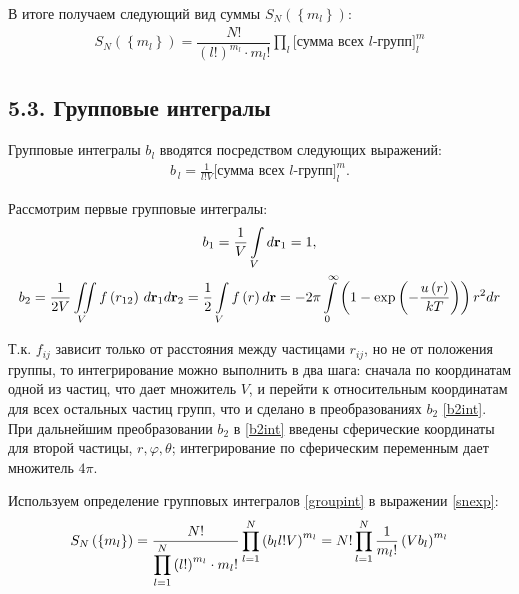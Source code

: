 В итоге получаем следующий вид суммы $S_N \left( \left\{ m_l \right\} \right)$:
\vverh
\begin{gather}
	S_N \left( \left\{ m_l \right\} \right) = \dfrac{N!}{\displaystyle \left( l! \right)^{m_l} \cdot m_l!} \prod_{l} \bigg[ \text{сумма всех $l$-групп} \bigg]^m_l \label{snexp}
\end{gather}

\subsection*{\textbf{5.3.} Групповые интегралы \cite{mayer}}

Групповые интегралы $b_l$ вводятся посредством следующих выражений:
\vverh
\begin{gather}
	b_{\, l} = \frac{1}{l! V} \bigg[ \text{сумма всех $l$-групп} \bigg]^m_l . \label{groupint}
\end{gather}

Рассмотрим первые групповые интегралы:
\vverh
\begin{gather}
	b_1 = \frac{1}{V} \int\limits_V d \mathbf{r}_1 = 1, \notag \\
	b_2 = \frac{1}{2 V} \iint\limits_V f \left( r_{12} \right) \, d \mathbf{r}_1 d \mathbf{r}_2 = \frac{1}{2} \int\limits_V f \left( r \right) d \mathbf{r} = - 2 \pi \int\limits_{0}^{\infty} \left( 1 - \exp \left( - \frac{u \left( r \right)}{kT} \right) \right) r^2 d r \label{b2int}  
\end{gather}

Т.к. $f_{ij}$ зависит только от расстояния между частицами $r_{ij}$, но не от положения группы, то интегрирование можно выполнить в два шага: сначала по координатам одной из частиц, что дает множитель $V$, и перейти к относительным координатам для всех остальных частиц групп, что и сделано в преобразованиях $b_2$ \eqref{b2int}. При дальнейшим преобразовании $b_2$ в \eqref{b2int} введены сферические координаты для второй частицы, $r, \varphi, \theta$; интегрирование по сферическим переменным дает множитель $4 \pi$.  

Используем определение групповых интегралов \eqref{groupint} в выражении \eqref{snexp}:
\vverh
\begin{gather}
	S_N \left( \left\{ m_l \right\} \right) = \frac{N!}{\displaystyle\prod_{l=1}^{N} \left( l! \right)^{m_l} \cdot m_l !} \prod_{l=1}^{N} \left( b_l l! V \right)^{m_l} = N! \prod_{l=1}^{N}  \frac{1}{m_l!} \left( V b_l \right)^{m_l} \label{snexp2}
\end{gather}


